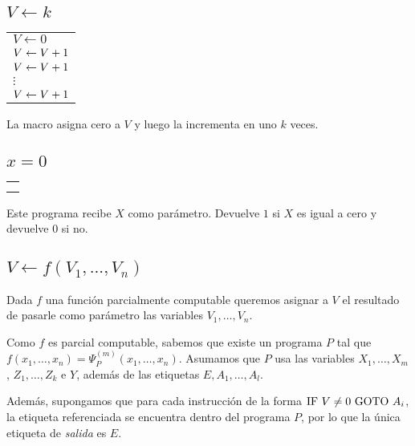 \subsection{$V \leftarrow k$}\label{appendix::otrasMAcros::asignarConstante}
\begin{multicols}{2}
	\begin{center}
	\begin{tabular}{l}
	$V \leftarrow 0$ \\
	$V \leftarrow V + 1$ \\
	$V \leftarrow V + 1$ \\
	$\vdots$ \\
	$V \leftarrow V + 1$ \\
\end{tabular}
	\end{center}
	
	\columnbreak
	La macro asigna cero a $V$ y luego la incrementa en uno $k$ veces.
\end{multicols}

\subsection{$x = 0$}
\begin{multicols}{2}
	\begin{center}
		\begin{tabular}{l}
			\sif{X}{E}\\
			\sincr{Y} \\
		\end{tabular}
	\end{center}

\columnbreak
Este programa recibe $X$ como parámetro. Devuelve $1$ si $X$ es igual a cero y devuelve $0$ si no.
\end{multicols}
\subsection{$V \leftarrow f(V_1,...,V_n)$}\label{appendix::otrasMAcros::asignacionFunc}

Dada $f$ una función parcialmente computable queremos asignar a $V$ el resultado de pasarle como parámetro las variables $V_1,\dots,V_n$.
	
Como $f$ es parcial computable, sabemos que existe un programa $P$ tal que $f(x_1,\dots,x_n) = \Psi_P^{(m)}(x_1,\dots,x_n)$. Asumamos que $P$ usa las variables $X_1,\dots, X_m$, $Z_1,\dots,Z_k$ e $Y$, además de las etiquetas $E, A_1,\dots,A_l$. 

Además, supongamos que para cada instrucción de la forma $\text{IF }V \neq 0 \text{ GOTO } A_i$, la etiqueta referenciada se encuentra dentro del programa $P$, por lo que la única etiqueta de \textit{salida} es $E$.

